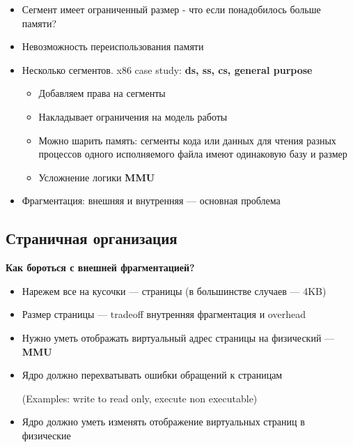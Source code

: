 \documentclass[../../lectures.tex]{subfiles}
\begin{document}
\begin{itemize}
    \item Сегмент имеет ограниченный размер - что если понадобилось больше памяти?
    \item Невозможность переиспользования памяти
    \item Несколько сегментов. x86 case study: \textbf{ds, ss, cs, general purpose}
          \begin{itemize}
              \item Добавляем права на сегменты
              \item Накладывает ограничения на модель работы
              \item Можно шарить память: сегменты кода или данных для чтения 
                    разных процессов одного исполняемого файла
                    имеют одинаковую базу и размер
              \item Усложнение логики \textbf{MMU}
          \end{itemize}
    \item Фрагментация: внешняя и внутренняя --- основная проблема
\end{itemize}

\subsection{Страничная организация}
\textbf{Как бороться с внешней фрагментацией?}
\begin{itemize}
    \item Нарежем все на кусочки --- страницы (в большинстве случаев ---  4KB)
    \item Размер страницы --- tradeoff внутренняя фрагментация и overhead
    \item Нужно уметь отображать виртуальный адрес страницы на физический --- \textbf{MMU}
    \item Ядро должно перехватывать ошибки обращений к страницам

          (Examples: write to read only, execute non executable)
    \item Ядро должно уметь изменять отображение виртуальных страниц в физические
\end{itemize}
\end{document}
